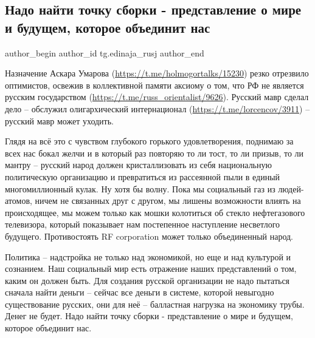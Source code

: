  
 
 
 
 
\subsection{Надо найти точку сборки - представление о мире и будущем, которое объединит нас}
\label{sec:11_01_2022.tg.edinaja_rusj.1.rus_narod_sborka}

\ifcmt
 author_begin
   author_id tg.edinaja_rusj
 author_end
\fi

Назначение Аскара Умарова (\url{https://t.me/holmogortalks/15230}) резко
отрезвило оптимистов, освежив в коллективной памяти аксиому о том, что РФ не
является русским государством (\url{https://t.me/russ_orientalist/9626}).
Русский мавр сделал дело – обслужил олигархический интернационал
(\url{https://t.me/lorcencov/3911}) – русский мавр может уходить. 

Глядя на всё это с чувством глубокого горького удовлетворения, поднимаю за всех
нас бокал желчи и в который раз повторяю то ли тост, то ли призыв, то ли мантру
– русский народ должен кристаллизовать из себя национальную политическую
организацию и превратиться из рассеянной пыли в единый многомиллионный кулак.
Ну хотя бы волну. Пока мы социальный газ из людей-атомов, ничем не связанных
друг с другом, мы лишены возможности влиять на происходящее, мы можем только
как мошки колотиться об стекло нефтегазового телевизора, который показывает нам
постепенное наступление несветлого будущего. Противостоять RF corporation может
только объединенный народ.

Политика – надстройка не только над экономикой, но еще и над культурой и
сознанием. Наш социальный мир есть отражение наших представлений о том, каким
он должен быть. Для создания русской организации не надо пытаться сначала найти
деньги – сейчас все деньги в системе, которой невыгодно существование русских,
они для неё – балластная нагрузка на экономику трубы. Денег не будет. Надо
найти точку сборки - представление о мире и будущем, которое объединит нас.

